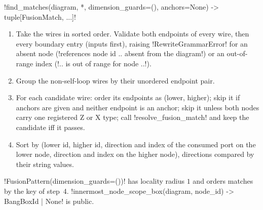 \begin{signature}
\py!find_matches(diagram, *, dimension_guards=(), anchors=None) -> tuple[FusionMatch, ...]!
\end{signature}
\begin{algorithm}\label{alg:rewriting-findfusion}
\leavevmode
\begin{enumerate}
\item Take the wires in sorted order. Validate both endpoints of every wire, then every boundary
  entry (inputs first), raising \py!RewriteGrammarError! for an absent node (\code!references node id .. absent from the diagram!) or an out-of-range index (\code!.. is out of range for node ..!).
\item Group the non-self-loop wires by their unordered endpoint pair.
\item For each candidate wire: order its endpoints as (lower, higher); skip it if anchors are
  given and neither endpoint is an anchor; skip it unless both nodes carry one registered Z or X
  type; call \py!resolve_fusion_match! and keep the candidate iff it passes.
\item Sort by (lower id, higher id, direction and index of the consumed port on the lower node,
  direction and index on the higher node), directions compared by their string values.
\end{enumerate}
\end{algorithm}

\py!FusionPattern(dimension_guards=())! has locality radius $1$ and orders matches by the key of
step~4. \py!innermost_node_scope_box(diagram, node_id) -> BangBoxId | None! is public.


